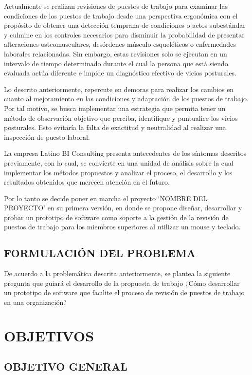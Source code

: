 Actualmente se realizan revisiones de puestos de trabajo para examinar las condiciones de los puestos de trabajo desde una perspectiva ergonómica con el propósito de obtener una detección temprana de condiciones o actos subestándar y culmine en los controles necesarios para disminuir la probabilidad de presentar alteraciones osteomusculares, desórdenes músculo esqueléticos o enfermedades laborales relacionadas. Sin embargo, estas revisiones solo se ejecutan en un intervalo de tiempo determinado durante el cual la persona que está siendo evaluada actúa diferente e impide un diagnóstico efectivo de vicios posturales.

Lo descrito anteriormente, repercute en demoras para realizar los cambios en cuanto al mejoramiento en las condiciones y adaptación de los puestos de trabajo. Por tal motivo, se busca implementar una estrategia que permita tener un método de observación objetivo que perciba, identifique y puntualice los vicios posturales. Esto evitaría la falta de exactitud y neutralidad al realizar una inspección de puesto laboral.

La empresa Latino BI Consulting presenta antecedentes de los síntomas descritos previamente, con lo cual, se convierte en una unidad de análisis sobre la cual implementar los métodos propuestos y analizar el proceso, el desarrollo y los resultados obtenidos que merecen atención en el futuro.

Por lo tanto se decide poner en marcha el proyecto ‘NOMBRE DEL PROYECTO’ en su primera versión, en donde se propone diseñar, desarrollar y probar un prototipo de software como soporte a la gestión de la revisión de puestos de trabajo para los miembros superiores al utilizar un mouse y teclado.

\section{FORMULACIÓN DEL PROBLEMA}
De acuerdo a la problemática descrita anteriormente, se plantea la siguiente pregunta que guiará el desarrollo de la propuesta de trabajo ¿Cómo desarrollar un prototipo de software que facilite el proceso de revisión de puestos de trabajo en una organización?

\chapter{OBJETIVOS}
\section{OBJETIVO GENERAL}
